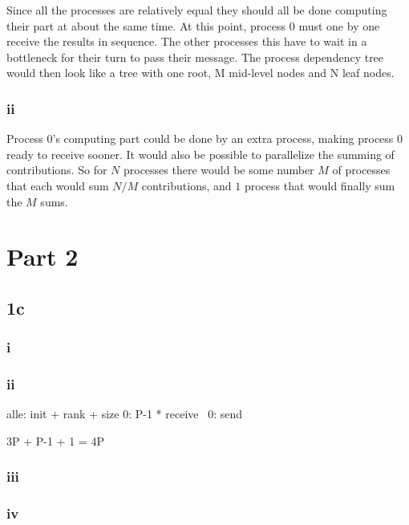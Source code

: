 Since all the processes are relatively equal they should all be done computing their part at about the same time.
At this point, process 0 must one by one receive the results in sequence.
The other processes this have to wait in a bottleneck for their turn to pass their message.
The process dependency tree would then look like a tree with one root, M mid-level nodes and N leaf nodes.

\subsubsection*{ii}
Process 0's computing part could be done by an extra process, making process 0 ready to receive sooner.
It would also be possible to parallelize the summing of contributions.
So for $N$ processes there would be some number $M$ of processes that each would sum $N / M$ contributions, and $1$ process that would finally sum the $M$ sums.

\section*{Part 2}
\subsection*{1c}
\subsubsection*{i}

\subsubsection*{ii}
alle:   init + rank + size
0:      P-1 * receive
~0:     send

3P + P-1 + 1 = 4P

\subsubsection*{iii}

\subsubsection*{iv}


